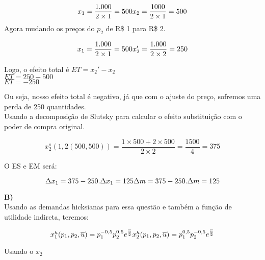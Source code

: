 \documentclass[a4paper, 12pt]{article} %
\begin{document}
\begin{flushleft}
\begin{equation}
x_{1} = \dfrac{1.000}{2 \times 1 } = 500
$$\\$$
x_{2} = \dfrac{1000}{2 \times 1} = 500
\end{equation}
Agora mudando os preços do $p_{2}$ de R\$ 1 para R\$ 2.

\begin{equation}
x_{1} = \dfrac{1.000}{2 \times 1} = 500
$$\\$$
x_{2}' = \dfrac{1.000}{2 \times 2} = 250
\end{equation}
\begin{center}
Logo, o efeito total é $ET = x_{2}' - x_{2}$
\\
$ET = 250 - 500$
\\
$ET = -250$ 
\end{center}
Ou seja, nosso efeito total é negativo, já que com o ajuste do preço, sofremos uma perda de 250 quantidades.
\\
Usando a decomposição de Slutsky para calcular o efeito substituição com o poder de compra original.

\begin{equation}
x_{2}^{s}(1,2(500,500)) = \dfrac{1 \times 500 + 2 \times 500}{2 \times 2} = \dfrac{1500}{4} = 375 
\end{equation}

\begin{center}
O ES e EM será:
\end{center}
\begin{equation}
\Delta x_{1} = 375 - 250.
$$\\$$
\Delta x_{1} = 125
$$\\$$
\Delta m = 375 - 250.
$$\\$$ 
\Delta m = 125
\end{equation}

\singlespacing

\textbf{B)}
\\
Usando as demandas hicksianas para essa questão e também a função de utilidade indireta, teremos:

\begin{equation}
$$\\$$
x_{1}^{h}(p_{1},p_{2}, \overline{u}) = p_{1}^{-0,5}p_{2}^{0,5}e^{\frac{\overline{u}}{2}}
$$\\$$
x_{2}^{h}(p_{1},p_{2}, \overline{u}) = p_{1}^{0,5}p_{2}^{-0,5}e^{\frac{\overline{u}}{2}}
\end{equation}

\begin{center}
Usando o $x_{2}$
\end{center}


\end{flushleft}
\end{document}

